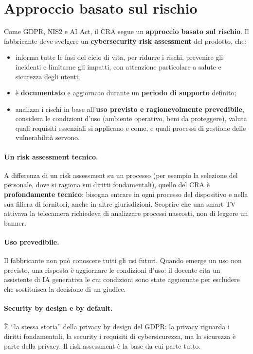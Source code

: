 \section{Approccio basato sul rischio}
\label{sec:cra-rischio}

Come GDPR, NIS2 e AI Act, il CRA segue un \textbf{approccio basato sul rischio}. Il fabbricante deve
svolgere un \textbf{cybersecurity risk assessment} del prodotto, che:
\begin{itemize}
  \item informa tutte le fasi del ciclo di vita, per ridurre i rischi, prevenire gli incidenti e
    limitarne gli impatti, con attenzione particolare a salute e sicurezza degli utenti;
  \item è \textbf{documentato} e aggiornato durante un \textbf{periodo di supporto} definito;
  \item analizza i rischi in base all'\textbf{uso previsto e ragionevolmente prevedibile}, considera le
    condizioni d'uso (ambiente operativo, beni da proteggere), valuta quali requisiti essenziali si
    applicano e come, e quali processi di gestione delle vulnerabilità servono.
\end{itemize}

\paragraph{Un risk assessment tecnico.} A differenza di un risk assessment su un processo (per esempio la
selezione del personale, dove si ragiona sui diritti fondamentali), quello del CRA è
\textbf{profondamente tecnico}: bisogna entrare in ogni processo del dispositivo e nella sua filiera di
fornitori, anche in altre giurisdizioni. Scoprire che una smart TV attivava la telecamera richiedeva di
analizzare processi nascosti, non di leggere un banner.

\paragraph{Uso prevedibile.} Il fabbricante non può conoscere tutti gli usi futuri. Quando emerge un uso
non previsto, una risposta è aggiornare le condizioni d'uso: il docente cita un assistente di IA
generativa le cui condizioni sono state aggiornate per escludere che sostituisca la decisione di un
giudice.

\paragraph{Security by design e by default.} È ``la stessa storia'' della privacy by design del GDPR: la
privacy riguarda i diritti fondamentali, la security i requisiti di cybersicurezza, ma la sicurezza è
parte della privacy. Il risk assessment è la base da cui parte tutto.

